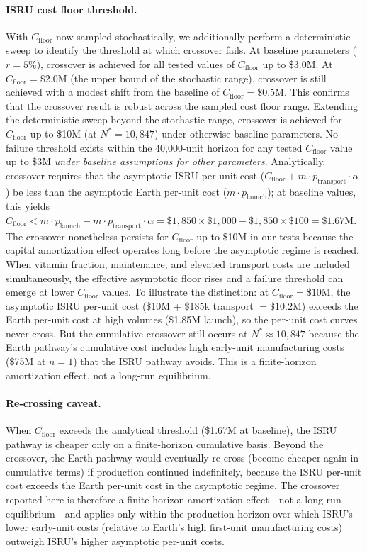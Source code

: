 \documentclass[preprint,12pt]{elsarticle}
\begin{document}
\paragraph{ISRU cost floor threshold.} With $C_{\mathrm{floor}}$ now sampled stochastically, we additionally perform a deterministic sweep to identify the threshold at which crossover fails. At baseline parameters ($r = 5\%$), crossover is achieved for all tested values of $C_{\mathrm{floor}}$ up to \$3.0M. At $C_{\mathrm{floor}} = \$2.0$M (the upper bound of the stochastic range), crossover is still achieved with a modest shift from the baseline of $C_{\mathrm{floor}} = \$0.5$M. This confirms that the crossover result is robust across the sampled cost floor range. Extending the deterministic sweep beyond the stochastic range, crossover is achieved for $C_{\mathrm{floor}}$ up to \$10M (at $N^* = 10{,}847$) under otherwise-baseline parameters. No failure threshold exists within the 40,000-unit horizon for any tested $C_{\mathrm{floor}}$ value up to \$3M \emph{under baseline assumptions for other parameters}. Analytically, crossover requires that the asymptotic ISRU per-unit cost ($C_{\mathrm{floor}} + m \cdot p_{\mathrm{transport}} \cdot \alpha$) be less than the asymptotic Earth per-unit cost ($m \cdot p_{\mathrm{launch}}$); at baseline values, this yields $C_{\mathrm{floor}} < m \cdot p_{\mathrm{launch}} - m \cdot p_{\mathrm{transport}} \cdot \alpha = \$1{,}850 \times \$1{,}000 - \$1{,}850 \times \$100 = \$1.67$M. The crossover nonetheless persists for $C_{\mathrm{floor}}$ up to \$10M in our tests because the capital amortization effect operates long before the asymptotic regime is reached. When vitamin fraction, maintenance, and elevated transport costs are included simultaneously, the effective asymptotic floor rises and a failure threshold can emerge at lower $C_{\mathrm{floor}}$ values. To illustrate the distinction: at $C_{\mathrm{floor}} = \$10$M, the asymptotic ISRU per-unit cost (\$10M + \$185k transport $= \$10.2$M) exceeds the Earth per-unit cost at high volumes (\$1.85M launch), so the per-unit cost curves never cross. But the cumulative crossover still occurs at $N^* \approx 10{,}847$ because the Earth pathway's cumulative cost includes high early-unit manufacturing costs (\$75M at $n = 1$) that the ISRU pathway avoids. This is a finite-horizon amortization effect, not a long-run equilibrium.

\paragraph{Re-crossing caveat.} When $C_{\mathrm{floor}}$ exceeds the analytical threshold (\$1.67M at baseline), the ISRU pathway is cheaper only on a finite-horizon cumulative basis. Beyond the crossover, the Earth pathway would eventually re-cross (become cheaper again in cumulative terms) if production continued indefinitely, because the ISRU per-unit cost exceeds the Earth per-unit cost in the asymptotic regime. The crossover reported here is therefore a finite-horizon amortization effect---not a long-run equilibrium---and applies only within the production horizon over which ISRU's lower early-unit costs (relative to Earth's high first-unit manufacturing costs) outweigh ISRU's higher asymptotic per-unit costs.
\end{document}

